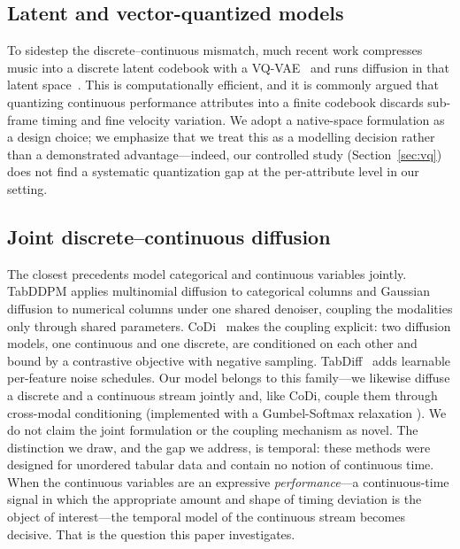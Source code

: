 \documentclass[review]{elsarticle}
\begin{document}
\subsection{Latent and vector-quantized models}
To sidestep the discrete--continuous mismatch, much recent work compresses music into a
discrete latent codebook with a VQ-VAE~\cite{vandenoord2017vqvae} and runs diffusion in
that latent space~\cite{zhang2024latent, huang2024vqdiffusion}. This is computationally
efficient, and it is commonly argued that quantizing continuous performance attributes into
a finite codebook discards sub-frame timing and fine velocity variation. We adopt a
native-space formulation as a design choice; we emphasize that we treat this as a modelling
decision rather than a demonstrated advantage---indeed, our controlled study
(Section~\ref{sec:vq}) does not find a systematic quantization gap at the per-attribute
level in our setting.

\subsection{Joint discrete--continuous diffusion}
The closest precedents model categorical and continuous variables jointly. TabDDPM
\cite{kotelnikov2023tabddpm} applies multinomial diffusion to categorical columns and
Gaussian diffusion to numerical columns under one shared denoiser, coupling the modalities
only through shared parameters. CoDi~\cite{lee2023codi} makes the coupling explicit: two
diffusion models, one continuous and one discrete, are conditioned on each other and bound
by a contrastive objective with negative sampling. TabDiff~\cite{shi2024tabdiff} adds
learnable per-feature noise schedules. Our model belongs to this family---we likewise
diffuse a discrete and a continuous stream jointly and, like CoDi, couple them through
cross-modal conditioning (implemented with a Gumbel-Softmax relaxation
\cite{jang2017gumbel}). We do not claim the joint formulation or the coupling mechanism as
novel. The distinction we draw, and the gap we address, is temporal: these methods were
designed for unordered tabular data and contain no notion of continuous time. When the
continuous variables are an expressive \emph{performance}---a continuous-time signal in
which the appropriate amount and shape of timing deviation is the object of
interest---the temporal model of the continuous stream becomes decisive. That is the
question this paper investigates.
\end{document}
